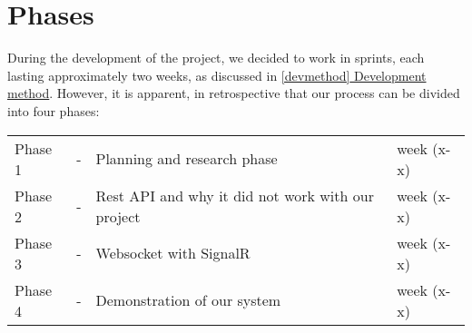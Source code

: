 \chapter{Phases}
During the development of the project, we decided to work in sprints, each lasting approximately two weeks, as discussed in \hyperref[devmethod]{\ref{devmethod} Development method}. However, it is apparent, in retrospective that our process can be divided into four phases:

\begin{center}
	\begin{tabular}{lcll}
		Phase 1 & - & Planning and research phase & week (x-x) \\
		Phase 2& - & Rest API and why it did not work with our project& week (x-x) \\
		Phase 3 & - & Websocket with SignalR & week (x-x) \\
		Phase 4 & - & Demonstration of our system & week (x-x) 
	\end{tabular}
\end{center}

%
%
%






